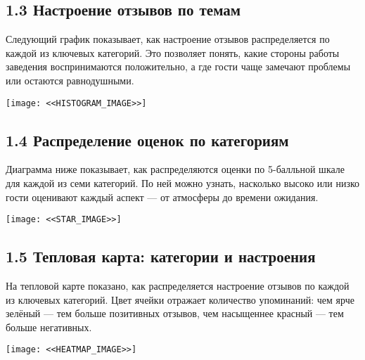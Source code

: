 \documentclass[a4paper,12pt]{extarticle}
\begin{document}
\subsection*{1.3 Настроение отзывов по темам}
\noindent
Следующий график показывает, как настроение отзывов распределяется по каждой из ключевых категорий.
Это позволяет понять, какие стороны работы заведения воспринимаются положительно, а где гости чаще замечают проблемы или остаются равнодушными.

\vspace{1em}
\begin{center}
    \texttt{[image: <<HISTOGRAM\_IMAGE>>]}
\end{center}
\vspace{1em}

\newpage

\subsection*{1.4 Распределение оценок по категориям}

\noindent
Диаграмма ниже показывает, как распределяются оценки по 5-балльной шкале для каждой из семи категорий.
По ней можно узнать, насколько высоко или низко гости оценивают каждый аспект — от атмосферы до времени ожидания.

\vspace{1em}
\begin{center}
    \texttt{[image: <<STAR\_IMAGE>>]}
\end{center}
\vspace{1em}

\noindent

\newpage


\subsection*{1.5 Тепловая карта: категории и настроения}

\noindent
На тепловой карте показано, как распределяется настроение отзывов по каждой из ключевых категорий.
Цвет ячейки отражает количество упоминаний: чем ярче зелёный — тем больше позитивных отзывов,
чем насыщеннее красный — тем больше негативных.

\vspace{1em}
\begin{center}
    \texttt{[image: <<HEATMAP\_IMAGE>>]}
\end{center}
\vspace{1em}
\end{document}
